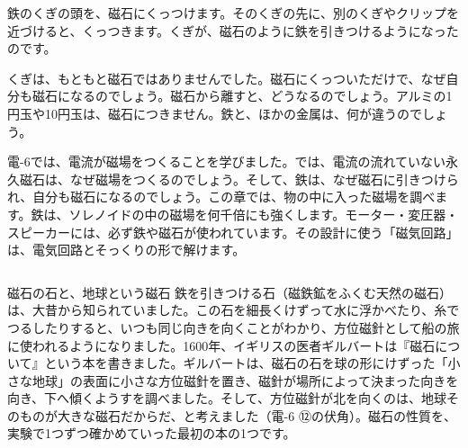 \begin{hatena}
\noindent\begin{minipage}[c]{0.55\linewidth}\raggedright
鉄のくぎの頭を、磁石にくっつけます。そのくぎの先に、別のくぎやクリップを近づけると、くっつきます。くぎが、磁石のように鉄を引きつけるようになったのです。

くぎは、もともと磁石ではありませんでした。磁石にくっついただけで、なぜ自分も磁石になるのでしょう。磁石から離すと、どうなるのでしょう。アルミの1円玉や10円玉は、磁石につきません。鉄と、ほかの金属は、何が違うのでしょう。
\end{minipage}\hfill
\begin{minipage}[c]{0.42\linewidth}\centering
{}
\end{minipage}
\end{hatena}

\noindent 電-6では、電流が磁場をつくることを学びました。では、電流の流れていない永久磁石は、なぜ磁場をつくるのでしょう。そして、鉄は、なぜ磁石に引きつけられ、自分も磁石になるのでしょう。この章では、物の中に入った磁場を調べます。鉄は、ソレノイドの中の磁場を何千倍にも強くします。モーター・変圧器・スピーカーには、必ず鉄や磁石が使われています。その設計に使う「磁気回路」は、電気回路とそっくりの形で解けます。

\begin{column}{磁石の石と、地球という磁石}
鉄を引きつける石（磁鉄鉱をふくむ天然の磁石）は、大昔から知られていました。この石を細長くけずって水に浮かべたり、糸でつるしたりすると、いつも同じ向きを向くことがわかり、方位磁針として船の旅に使われるようになりました。1600年、イギリスの医者ギルバートは『磁石について』という本を書きました。ギルバートは、磁石の石を球の形にけずった「小さな地球」の表面に小さな方位磁針を置き、磁針が場所によって決まった向きを向き、下へ傾くようすを調べました。そして、方位磁針が北を向くのは、地球そのものが大きな磁石だからだ、と考えました（電-6 ⑫の伏角）。磁石の性質を、実験で1つずつ確かめていった最初の本の1つです。
\end{column}

